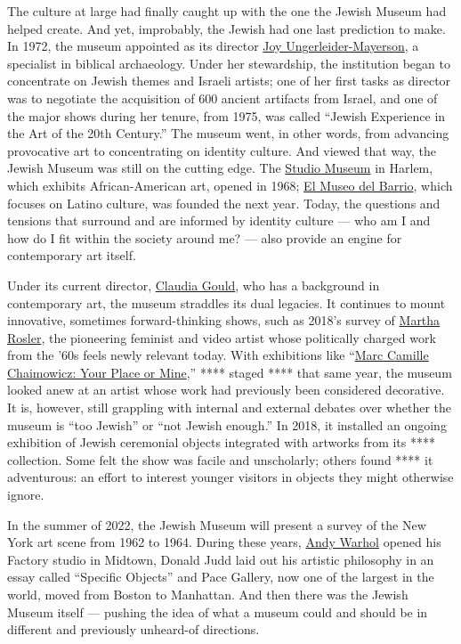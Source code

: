 The culture at large had finally caught up with the one the Jewish
Museum had helped create. And yet, improbably, the Jewish had one last
prediction to make. In 1972, the museum appointed as its director
\href{https://www.nytimes.com/1994/09/09/obituaries/joy-ungerleider-mayerson-74-former-head-of-jewish-museum.html}{Joy
Ungerleider-Mayerson}, a specialist in biblical archaeology. Under her
stewardship, the institution began to concentrate on Jewish themes and
Israeli artists; one of her first tasks as director was to negotiate the
acquisition of 600 ancient artifacts from Israel, and one of the major
shows during her tenure, from 1975, was called ``Jewish Experience in
the Art of the 20th Century.'' The museum went, in other words, from
advancing provocative art to concentrating on identity culture. And
viewed that way, the Jewish Museum was still on the cutting edge. The
\href{https://studiomuseum.org/}{Studio Museum} in Harlem, which
exhibits African-American art, opened in 1968;
\href{https://www.elmuseo.org/}{El Museo del Barrio}, which focuses on
Latino culture, was founded the next year. Today, the questions and
tensions that surround and are informed by identity culture --- who am I
and how do I fit within the society around me? --- also provide an
engine for contemporary art itself.

Under its current director,
\href{https://www.nytimes.com/2019/02/21/t-magazine/jane-mayle-claudia-gould.html}{Claudia
Gould}, who has a background in contemporary art, the museum straddles
its dual legacies. It continues to mount innovative, sometimes
forward-thinking shows, such as 2018's survey of
\href{https://www.nytimes.com/2019/02/14/t-magazine/martha-rosler.html}{Martha
Rosler}, the pioneering feminist and video artist whose politically
charged work from the '60s feels newly relevant today. With exhibitions
like
``\href{https://www.nytimes.com/2018/03/15/t-magazine/marc-camille-chaimowicz.html}{Marc
Camille Chaimowicz: Your Place or Mine},'' **** staged **** that same
year, the museum looked anew at an artist whose work had previously been
considered decorative. It is, however, still grappling with internal and
external debates over whether the museum is ``too Jewish'' or ``not
Jewish enough.'' In 2018, it installed an ongoing exhibition of Jewish
ceremonial objects integrated with artworks from its **** collection.
Some felt the show was facile and unscholarly; others found **** it
adventurous: an effort to interest younger visitors in objects they
might otherwise ignore.

In the summer of 2022, the Jewish Museum will present a survey of the
New York art scene from 1962 to 1964. During these years,
\href{https://www.nytimes.com/2018/05/02/t-magazine/andy-warhol-photo-portraits.html}{Andy
Warhol} opened his Factory studio in Midtown, Donald Judd laid out his
artistic philosophy in an essay called ``Specific Objects'' and Pace
Gallery, now one of the largest in the world, moved from Boston to
Manhattan. And then there was the Jewish Museum itself --- pushing the
idea of what a museum could and should be in different and previously
unheard-of directions.

